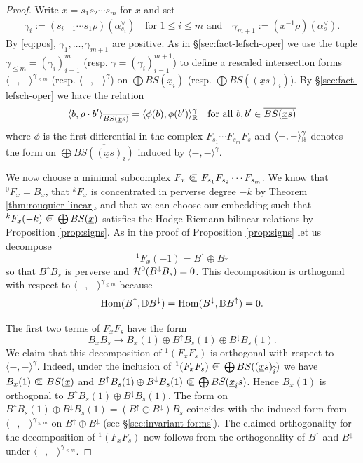 \documentclass[11pt]{amsart}
\numberwithin{equation}{section}
\def\a{\alpha}
\def\g{\gamma}
\def\ov{\overline}
\def\un{\underline}
\def\to{\rightarrow}
\def\summand{
\mathbin{\tikz [baseline=-3pt]
{
\clip (-0.2,-0.15) rectangle (0.2,0.15);
\node[scale=1.2] at (0,0) {$\subset$}; \node[scale=0.5] at
  (0,0) {$\oplus$}; }}
}
\theoremstyle{definition}
\theoremstyle{remark}
\begin{document}
{\begin{proof} Write $\un{x} = s_1s_2 \cdots s_m$ for $x$ and set 
\begin{gather*}
\g_i := ( s_{i-1} \cdots s_1 \rho)(\a_{s_i}^\vee)  \quad
\text{for $1 \le i \le m$ and} \quad 
\g_{m+1} := ( x^{-1} \rho)(\a_s^\vee).
\end{gather*}
By \eqref{eq:pos}, $\gamma_1, \dots, \gamma_{m+1}$ are positive.
 As in \S\ref{sec:fact-lefsch-oper} we use the
  tuple $\gamma_{\le m} = (\gamma_i)_{i=1}^m$ (resp. 
  $\gamma = (\gamma_i)_{i=1}^{m+1}$) to
define a rescaled intersection forms $\langle -, - \rangle^{\g_{\le
    m}}$ (resp. $\langle -, - \rangle^\g$) on $\bigoplus
BS(\un{x}_{\hat{i}})$ (resp. $\bigoplus
BS((\un{x}s)_{\widehat{i}})$). By
\S\ref{sec:fact-lefsch-oper} we have the relation
\begin{equation} \label{eq:phiL2}
\langle b, \rho \cdot b'
\rangle_{\ov{BS(\un{x}s)}} = \langle \phi(b), \phi(b') \rangle_\RM^\g \quad \text{for all $b, b' \in \ov{BS(\un{x}s)}$}
\end{equation}
where $\phi$ is the first differential in the complex $F_{s_1} \cdots
F_{s_m}F_s$ and $\langle -, - \rangle^\g_\RM$ denotes the form
on $\bigoplus \overline{BS((\un{x}s)_{\widehat{i}})}$ induced by
$\langle -, - \rangle^\g$.


We now choose a minimal subcomplex $F_x \summand F_{s_1}F_{s_2} \cdots
F_{s_m}$. We know that ${}^0F_x = B_x$, that ${}^kF_x$ is concentrated
in perverse degree $-k$ by Theorem \ref{thm:rouquier linear},
and that we can choose our embedding such that ${}^kF_x(-k) \summand \bigoplus BS(\un{x})$
satisfies the Hodge-Riemann bilinear relations by Proposition
\ref{prop:signs}. As in the proof of Proposition \ref{prop:signs} let
us decompose
\[
{}^1F_x(-1) = B^{\uparrow} \oplus B^{\downarrow}
\]
so that $B^{\uparrow}B_s$ is perverse and ${\mathcal{H}}^0(B^{\downarrow}B_s)
= 0$. This decomposition is orthogonal with respect to
$\langle -, - \rangle^{\g_{\le m}}$ because
\[ \operatorname{Hom}(B^\uparrow, {\mathbb{D}} B^\downarrow)
= \operatorname{Hom}(B^\downarrow, {\mathbb{D}} B^\uparrow)
= 0.\]

The first two terms of $F_xF_s$ have the form
\[
B_xB_s \to B_x(1) \oplus B^{\uparrow}B_s(1)
\oplus B^{\downarrow}B_s(1).
\]
We claim that this decomposition of ${}^1(F_xF_s)$ is orthogonal with respect to
$\langle -, - \rangle^\g$. Indeed, under the inclusion of ${}^1(F_xF_s)
\summand \bigoplus BS((\underline{x}s)_{\widehat{i}})$ we have $B_x(1)
\summand BS(\un{x})$ and $B^{\uparrow}B_s(1)
\oplus B^{\downarrow}B_s(1) \summand \bigoplus BS(\un{x}_{\hat{i}}s)$. Hence $B_x(1)$ is orthogonal to $B^\uparrow
B_s(1) \oplus B^{\downarrow}B_s(1)$. The form on $B^{\uparrow}B_s(1)
\oplus B^{\downarrow}B_s(1) = (B^\uparrow \oplus B^\downarrow)B_s$
coincides with the induced form from $\langle -, -\rangle^{\gamma_{\le
    m}}$ on $B^\uparrow \oplus B^\downarrow$ (see \S\!\ref{sec:invariant
  forms}). The claimed
orthogonality for the decomposition of ${}^1(F_xF_s)$ now
follows from the orthogonality of $B^\uparrow$ and $B^\downarrow$
under $\langle -, -\rangle^{\gamma_{\le m}}$.


\end{proof}}
\end{document}
